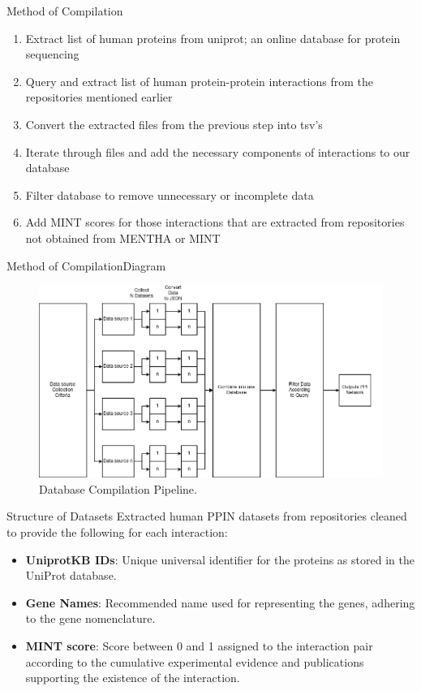 \documentclass[aspectratio=169]{beamer}
\begin{document}
\begin{frame}{Method of Compilation}
    \begin{enumerate}
        \item Extract list of human proteins from uniprot; an online database for protein sequencing
        \item Query and extract list of human protein-protein interactions from the repositories mentioned earlier
        \item Convert the extracted files from the previous step into tsv's
        \item Iterate through files and add the necessary components of interactions to our database
        \item Filter database to remove unnecessary or incomplete data
        \item Add MINT scores for those interactions that are extracted from repositories not obtained from MENTHA or MINT
    \end{enumerate}
\end{frame}

\begin{frame}{Method of Compilation}{Diagram}
\begin{figure}[h!]
    \centering
\includegraphics[scale=0.3]{Documentation/Presentation/data-pipeline.png}
\caption{Database Compilation Pipeline.}
\label{fig: data_pipelinediag}
\end{figure}
\end{frame}

\begin{frame}{Structure of Datasets}
Extracted human PPIN datasets from repositories cleaned to provide the following for each interaction:
    \begin{itemize}
        \item \textbf{UniprotKB IDs}: Unique universal identifier for the proteins as stored in the UniProt database.
        \item \textbf{Gene Names}: Recommended name used for representing the genes, adhering to the gene nomenclature.
        \item \textbf{MINT score}: Score between 0 and 1 assigned to the interaction pair according to the cumulative experimental evidence and publications supporting the existence of the interaction.
        
    \end{itemize}
\end{frame}
\end{document}
